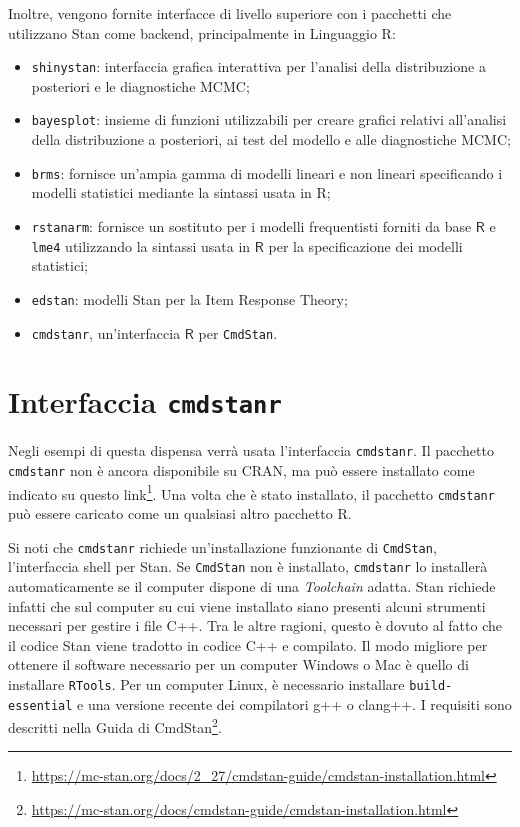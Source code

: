 \documentclass[
  11pt,
]{krantz}
\providecommand{\tightlist}{%
  \setlength{\itemsep}{0pt}\setlength{\parskip}{0pt}}
\renewcommand{\href}[2]{#2\footnote{\url{#1}}}
\newcommand{\R}{\textsf{R}} %
\theoremstyle{definition}
\theoremstyle{definition}
\theoremstyle{definition}
\theoremstyle{definition}
\theoremstyle{remark}
\begin{document}
Inoltre, vengono fornite interfacce di livello superiore con i pacchetti che utilizzano Stan come backend, principalmente in Linguaggio \R:

\begin{itemize}
\tightlist
\item
  \texttt{shinystan}: interfaccia grafica interattiva per l'analisi della distribuzione a posteriori e le diagnostiche MCMC;
\item
  \texttt{bayesplot}: insieme di funzioni utilizzabili per creare grafici relativi all'analisi della distribuzione a posteriori, ai test del modello e alle diagnostiche MCMC;
\item
  \texttt{brms}: fornisce un'ampia gamma di modelli lineari e non lineari specificando i modelli statistici mediante la sintassi usata in \R;
\item
  \texttt{rstanarm}: fornisce un sostituto per i modelli frequentisti forniti da base \(\R\) e \texttt{lme4} utilizzando la sintassi usata in \(\R\) per la specificazione dei modelli statistici;
\item
  \texttt{edstan}: modelli Stan per la Item Response Theory;
\item
  \texttt{cmdstanr}, un'interfaccia \(\R\) per \texttt{CmdStan}.
\end{itemize}

\hypertarget{interfaccia-cmdstanr}{%
\section{\texorpdfstring{Interfaccia \texttt{cmdstanr}}{Interfaccia cmdstanr}}\label{interfaccia-cmdstanr}}

Negli esempi di questa dispensa verrà usata l'interfaccia \texttt{cmdstanr}. Il pacchetto \texttt{cmdstanr} non è ancora disponibile su CRAN, ma può essere installato come indicato su questo \href{https://mc-stan.org/docs/2_27/cmdstan-guide/cmdstan-installation.html}{link}. Una volta che è stato installato, il pacchetto \texttt{cmdstanr} può essere caricato come un qualsiasi altro pacchetto R.

Si noti che \texttt{cmdstanr} richiede un'installazione funzionante di \texttt{CmdStan}, l'interfaccia shell per Stan. Se \texttt{CmdStan} non è installato, \texttt{cmdstanr} lo installerà automaticamente se il computer dispone di una \emph{Toolchain} adatta. Stan richiede infatti che sul computer su cui viene installato siano presenti alcuni strumenti necessari per gestire i file C++. Tra le altre ragioni, questo è dovuto al fatto che il codice Stan viene tradotto in codice C++ e compilato. Il modo migliore per ottenere il software necessario per un computer Windows o Mac è quello di installare \texttt{RTools}. Per un computer Linux, è necessario installare \texttt{build-essential} e una versione recente dei compilatori g++ o clang++. I requisiti sono descritti nella \href{https://mc-stan.org/docs/cmdstan-guide/cmdstan-installation.html}{Guida di CmdStan}.
\end{document}
